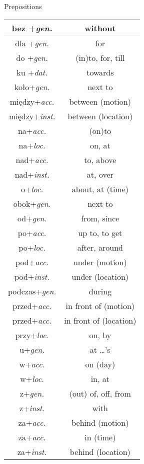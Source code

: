 \documentclass[10pt,twoside]{../filofax2}
\begin{document}
\begin{ffpage}{\Huge Prepositions }
\begin{tabular}{|c|c|}
\hline
bez +\textit{gen.}&without\\\hline
dla +\textit{gen.}&for\\\hline
do +\textit{gen.}&(in)to, for, till\\\hline
ku +\textit{dat.}&towards\\\hline
koło+\textit{gen.}&next to\\\hline
między+\textit{acc.}&between \scriptsize{(motion)}\\\hline
między+\textit{inst.}&between \scriptsize{(location)}\\\hline
na+\textit{acc.}&(on)to\\\hline
na+\textit{loc.}&on, at\\\hline
nad+\textit{acc.}&to, above\\\hline
nad+\textit{inst.}&at, over\\\hline
o+\textit{loc.}& about, at \scriptsize{(time)}\\\hline
obok+\textit{gen.}&next to\\\hline
od+\textit{gen.}&from, since\\\hline
po+\textit{acc.}&up to, to get\\\hline
po+\textit{loc.}&after, around\\\hline
pod+\textit{acc.}&under \scriptsize{(motion)}\\\hline
pod+\textit{inst.}&under \scriptsize{(location)}\\\hline
podczas+\textit{gen.}&during\\\hline
przed+\textit{acc.}&in front of \scriptsize{(motion)}\\\hline
przed+\textit{acc.}&in front of \scriptsize{(location)}\\\hline
przy+\textit{loc.}&on, by\\\hline
u+\textit{gen.}&at \dots's\\\hline
w+\textit{acc.}&on \scriptsize{(day)}\\\hline
w+\textit{loc.}&in, at\\\hline
z+\textit{gen.}&(out) of, off, from\\\hline
z+\textit{inst.}&with\\\hline
za+\textit{acc.}&behind \scriptsize{(motion)}\\\hline
za+\textit{acc.}&in \scriptsize{(time)}\\\hline
za+\textit{inst.}&behind \scriptsize{(location)}\\\hline
\end{tabular}

\end{ffpage}
\newcommand{\entry}[2]{{\flushleft#1\hfill}{ \hfill \flushright#2}}
\end{document}
